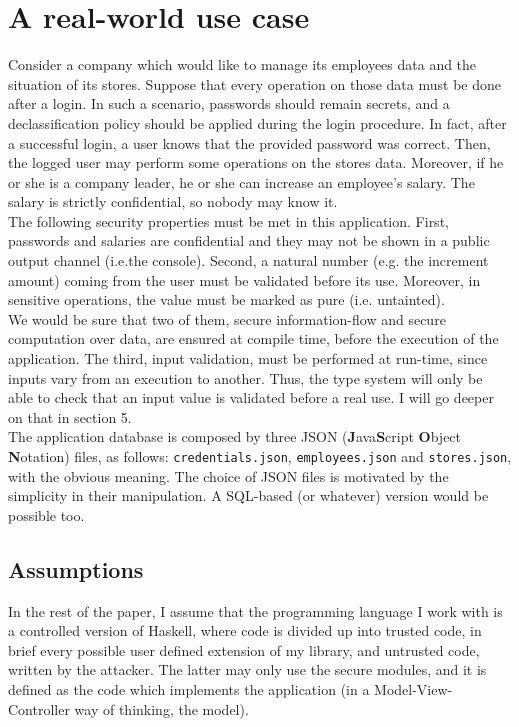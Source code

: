 \section{A real-world use case}\label{sec:example}
Consider a company which would like to manage its employees data and the situation of its stores. Suppose that every operation on those data must be done after a login. In such a scenario, passwords should remain secrets, and a declassification policy should be applied during the login procedure. In fact, after a successful login, a user knows that the provided password was correct. Then, the logged user may perform some operations on the stores data. Moreover, if he or she is a company leader, he or she can increase an employee's salary. The salary is strictly confidential, so nobody may know it. \\
The following security properties must be met in this application. First, passwords and salaries are confidential and they may not be shown in a public output channel (i.e.the console). Second, a natural number (e.g. the increment amount) coming from the user must be validated before its use. Moreover, in sensitive operations, the value must be marked as pure (i.e. untainted). \\
We would be sure that two of them, secure information-flow and secure computation over data, are ensured at compile time, before the execution of the application. The third, input validation, must be performed at run-time, since inputs vary from an execution to another. Thus, the type system will only be able to check that an input value is validated before a real use. I will go deeper on that in section 5. \\
The application database is composed by three JSON (\textbf{J}ava\textbf{S}cript \textbf{O}bject \textbf{N}otation) files, as follows: \texttt{credentials.json}, \texttt{employees.json} and \texttt{stores.json}, with the obvious meaning. The choice of JSON files is motivated by the simplicity in their manipulation. A SQL-based (or whatever) version would be possible too.

\subsection{Assumptions}
In the rest of the paper, I assume that the programming language I work with is a controlled version of Haskell, where code is divided up into trusted code, in brief every possible user defined extension of my library, and untrusted code, written by the attacker. The latter may only use the secure modules, and it is defined as the code which implements the application (in a Model-View-Controller way of thinking, the model). 

